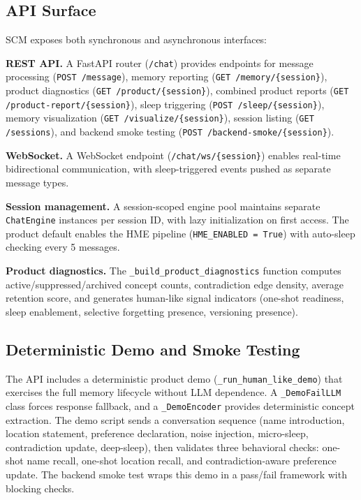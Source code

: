 \documentclass[11pt,twocolumn]{article}
\begin{document}
\subsection{API Surface}

SCM exposes both synchronous and asynchronous interfaces:

\textbf{REST API.} A FastAPI router (\texttt{/chat}) provides endpoints for message processing (\texttt{POST /message}), memory reporting (\texttt{GET /memory/\{session\}}), product diagnostics (\texttt{GET /product/\{session\}}), combined product reports (\texttt{GET /product-report/\{session\}}), sleep triggering (\texttt{POST /sleep/\{session\}}), memory visualization (\texttt{GET /visualize/\{session\}}), session listing (\texttt{GET /sessions}), and backend smoke testing (\texttt{POST /backend-smoke/\{session\}}).

\textbf{WebSocket.} A WebSocket endpoint (\texttt{/chat/ws/\{session\}}) enables real-time bidirectional communication, with sleep-triggered events pushed as separate message types.

\textbf{Session management.} A session-scoped engine pool maintains separate \texttt{ChatEngine} instances per session ID, with lazy initialization on first access. The product default enables the HME pipeline (\texttt{HME\_ENABLED = True}) with auto-sleep checking every 5 messages.

\textbf{Product diagnostics.} The \texttt{\_build\_product\_diagnostics} function computes active/suppressed/archived concept counts, contradiction edge density, average retention score, and generates human-like signal indicators (one-shot readiness, sleep enablement, selective forgetting presence, versioning presence).

\subsection{Deterministic Demo and Smoke Testing}

The API includes a deterministic product demo (\texttt{\_run\_human\_like\_demo}) that exercises the full memory lifecycle without LLM dependence. A \texttt{\_DemoFailLLM} class forces response fallback, and a \texttt{\_DemoEncoder} provides deterministic concept extraction. The demo script sends a conversation sequence (name introduction, location statement, preference declaration, noise injection, micro-sleep, contradiction update, deep-sleep), then validates three behavioral checks: one-shot name recall, one-shot location recall, and contradiction-aware preference update. The backend smoke test wraps this demo in a pass/fail framework with blocking checks.
\end{document}

